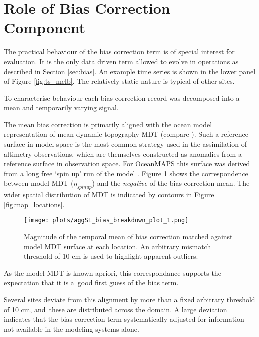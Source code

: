 \section{Role of Bias Correction Component}
\label{sec:bias_more}

The practical behaviour of the bias correction term is of special interest for evaluation.   
It is the only data driven term allowed to evolve in operations as described in Section \ref{sec:bias}.
An example time series is shown in the lower panel of Figure \ref{fig:ts_melb}.
The relatively static nature is typical of other sites.


To characterise behaviour each bias correction record was decomposed into a mean and temporarily varying signal.

The mean bias correction is primarily aligned with the ocean model representation of mean dynamic topography MDT (compare \cite{Slobbe:wk}).
Such a reference surface in model space is the most common strategy used in the assimilation of altimetry observations, which are themselves constructed as anomalies from a reference surface in observation space. For OceanMAPS this surface was derived from a long free `spin up' run of the model \cite{Oke:2013fm}. 
Figure \ref{fig:bias_mean} shows the correspondence between model MDT ($\eta_{spinup}$) and the \textit{negative} of the bias correction mean.   The wider spatial distribution of MDT is indicated by contours in Figure \ref{fig:map_locations}.

\begin{figure}[H]
\centering
\texttt{[image: plots/aggSL\_bias\_breakdown\_plot\_1.png]}
\caption{ Magnitude of the temporal mean of bias correction matched against model MDT surface at each location. An arbitrary mismatch threshold of 10 cm is used to highlight apparent outliers.}\vspace{-6pt}
\label{fig:bias_mean}
\end{figure}   

As the model MDT is known apriori, this correspondance supports the expectation that it is a~good first guess of the bias term.

Several sites deviate from this alignment by more than a fixed arbitrary threshold of 10 cm, and~these are distributed across the domain.
A large deviation indicates that the bias correction term systematically adjusted for information not available in the modeling systems alone.  


